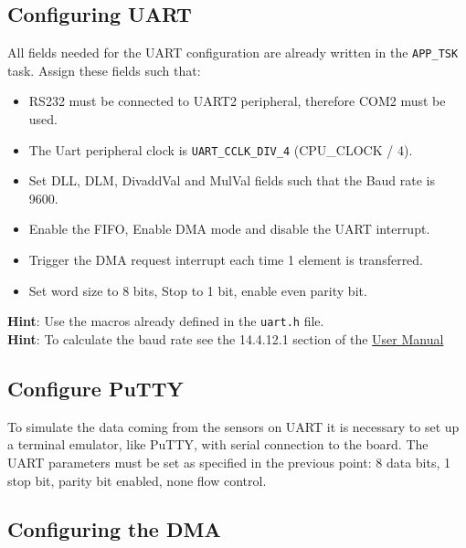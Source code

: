 \documentclass[a4paper]{article}
\begin{document}

\subsection{Configuring UART}
All fields needed for the UART configuration are already written in the \texttt{APP\_TSK} task. Assign these fields such that:
\begin{itemize}
    \item RS232 must be connected to UART2 peripheral, therefore COM2 must be used.
    \item The Uart peripheral clock is \texttt{UART\_CCLK\_DIV\_4} (CPU\_CLOCK / 4).
    \item Set DLL, DLM, DivaddVal and MulVal fields such that the Baud rate is 9600.
    \item Enable the FIFO, Enable DMA mode and disable the UART interrupt.
    \item Trigger the DMA request interrupt each time 1 element is transferred.
    \item Set word size to 8 bits, Stop to 1 bit, enable even parity bit.
\end{itemize}

\textbf{Hint}: Use the macros already defined in the \texttt{uart.h} file.
\\
\textbf{Hint}: To calculate the baud rate see the 14.4.12.1 section of the \href{https://www.keil.com/dd/docs/datashts/philips/lpc17xx_um.pdf}{User Manual}


\subsection{Configure PuTTY}
To simulate the data coming from the sensors on UART it is necessary to set up a terminal emulator, like PuTTY, with serial connection to the board. The UART parameters must be set as specified in the previous point:  8 data bits, 1 stop bit, parity bit enabled, none flow control. 


\subsection{Configuring the DMA}
     
\end{document}
